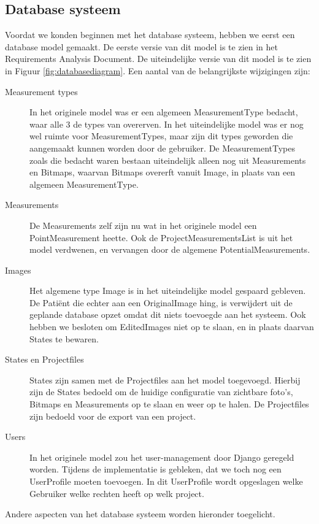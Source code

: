 \subsection{Database systeem}
\label{implementatie_database_systeem}
Voordat we konden beginnen met het database systeem, hebben we eerst een database model gemaakt. De eerste versie van dit model is te zien in het Requirements Analysis Document.
De uiteindelijke versie van dit model is te zien in Figuur \ref{fig:databasediagram}.
Een aantal van de belangrijkste wijzigingen zijn:
\begin{description}
  \item[Measurement types] In het originele model was er een algemeen MeasurementType bedacht, waar alle 3 de types van overerven. 
  In het uiteindelijke model was er nog wel ruimte voor MeasurementTypes, maar zijn dit types geworden die aangemaakt kunnen worden door de gebruiker.
  De MeasurementTypes zoals die bedacht waren bestaan uiteindelijk alleen nog uit Measurements en Bitmaps, waarvan Bitmaps overerft vanuit Image, in plaats van een algemeen MeasurementType.
  \item[Measurements] De Measurements zelf zijn nu wat in het originele model een PointMeasurement heette.
  Ook de ProjectMeasurementsList is uit het model verdwenen, en vervangen door de algemene PotentialMeasurements.
  \item[Images] Het algemene type Image is in het uiteindelijke model gespaard gebleven.
  De Pati\"{e}nt die echter aan een OriginalImage hing, is verwijdert uit de geplande database opzet omdat dit niets toevoegde aan het systeem.
  Ook hebben we besloten om EditedImages niet op te slaan, en in plaats daarvan States te bewaren.
  \item[States en Projectfiles] States zijn samen met de Projectfiles aan het model toegevoegd.
  Hierbij zijn de States bedoeld om de huidige configuratie van zichtbare foto's, Bitmaps en Measurements op te slaan en weer op te halen.
  De Projectfiles zijn bedoeld voor de export van een project.
  \item[Users] In het originele model zou het user-management door Django geregeld worden.
  Tijdens de implementatie is gebleken, dat we toch nog een UserProfile moeten toevoegen.
  In dit UserProfile wordt opgeslagen welke Gebruiker welke rechten heeft op welk project.
\end{description}
Andere aspecten van het database systeem worden hieronder toegelicht.


